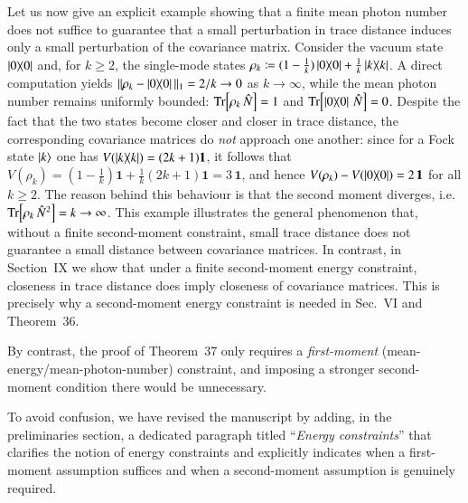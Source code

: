 \documentclass[a4paper,12pt]{article}
\newenvironment{Response}
{\noindent \color{RawSienna}{\bf Response:} }
{\vspace{0.4 cm}}
\begin{document}
\begin{Response}
Let us now give an explicit example showing that a finite mean photon number does not suffice to guarantee that a small perturbation in trace distance induces only a small perturbation of the covariance matrix. Consider the vacuum state $\ketbra{0}$ and, for $k\ge 2$, the single-mode states $\rho_k \coloneqq (1-\frac{1}{k})\ketbra{0}+\frac{1}{k}\ketbra{k}{k}$. A direct computation yields $\|\rho_k-\ketbra{0}\|_1=2/k\to 0$ as $k\to\infty$, while the mean photon number remains uniformly bounded: $\Tr[\rho_k\,\hat N]=1$ and $\Tr[\ketbra{0}\,\hat N]=0$. Despite the fact that the two states become closer and closer in trace distance, the corresponding covariance matrices do \emph{not} approach one another: since for a Fock state $\ket{k}$ one has $V(\ketbra{k})=(2k+1)\mathbf{1}$, it follows that $V(\rho_k)=(1-\frac{1}{k})\mathbf{1}+\frac{1}{k}(2k+1)\mathbf{1}=3\,\mathbf{1}$, and hence $V(\rho_k)-V(\ketbra{0})=2\,\mathbf{1}$ for all $k\ge 2$. The reason behind this behaviour is that the second moment diverges, i.e.~$\Tr[\rho_k\,\hat N^2]=k\to\infty$. This example illustrates the general phenomenon that, without a finite second-moment constraint, small trace distance does not guarantee a small distance between covariance matrices. In contrast, in Section~IX we show that under a finite second-moment energy constraint, closeness in trace distance does imply closeness of covariance matrices. This is precisely why a second-moment energy constraint is needed in Sec.~VI and Theorem~36.


By contrast, the proof of Theorem~37 only requires a \emph{first-moment} (mean-energy/mean-photon-number) constraint, and imposing a stronger second-moment condition there would be unnecessary.

To avoid confusion, we have revised the manuscript by adding, in the preliminaries section, a dedicated paragraph titled ``\emph{Energy constraints}'' that clarifies the notion of energy constraints and explicitly indicates when a first-moment assumption suffices and when a second-moment assumption is genuinely required.  
\end{Response}
\end{document}
